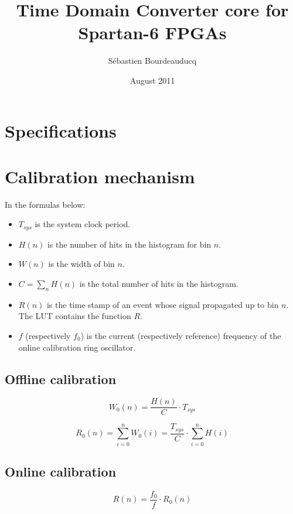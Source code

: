 \documentclass[a4paper,11pt]{article}
\title{Time Domain Converter core for Spartan-6 FPGAs}
\author{S\'ebastien Bourdeauducq}
\date{August 2011}
\begin{document}
\setlength{\parindent}{0pt}
\setlength{\parskip}{5pt}
\maketitle{}
\section{Specifications}

\section{Calibration mechanism}
In the formulas below:
\begin{itemize}
\item $T_{sys}$ is the system clock period.
\item $H(n)$ is the number of hits in the histogram for bin $n$.
\item $W(n)$ is the width of bin $n$.
\item $C = \displaystyle\sum\limits_{n} H(n)$ is the total number of hits in the histogram.
\item $R(n)$ is the time stamp of an event whose signal propagated up to bin $n$. The LUT contains the function $R$.
\item $f$ (respectively $f_{0}$) is the current (respectively reference) frequency of the online calibration ring oscillator.
\end{itemize}

\subsection{Offline calibration}
\begin{equation}
W_{0}(n) = \frac{H(n)}{C} \cdot T_{sys}
\end{equation}

\begin{equation}
R_{0}(n) = \displaystyle\sum\limits_{i=0}^{n}{W_{0}(i)} = \frac{T_{sys}}{C} \cdot \displaystyle\sum\limits_{i=0}^{n}{H(i)}
\end{equation}

\subsection{Online calibration}

\begin{equation}
R(n) = \frac{f_{0}}{f} \cdot R_{0}(n)
\end{equation}
\end{document}
